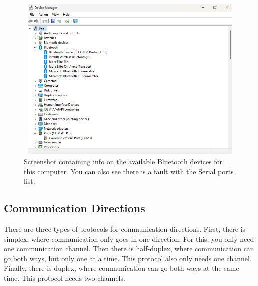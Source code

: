 \documentclass[11pt, A4paper, english]{article}
\begin{document}
			\begin{figure}
\includegraphics[width=12.6cm, height=8cm]{com_info}
\caption{Screenshot containing info on the available Bluetooth devices for this computer. You can also see there is a fault with the Serial ports list.}
\label{im:com_info}	
			\end{figure}

		\subsection{Communication Directions}
There are three types of protocols for communication directions. First, there is simplex, where communication only goes in one direction. For this, you only need one communication channel. Then there is half-duplex, where communication can go both ways, but only one at a time. This protocol also only needs one channel. Finally, there is duplex, where communication can go both ways at the same time. This protocol needs two channels.
\end{document}
